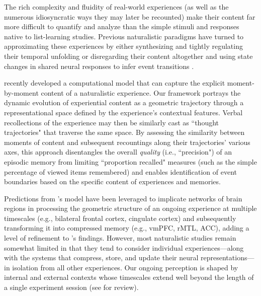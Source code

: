 \documentclass{article}
\begin{document}
The rich complexity and fluidity of real-world experiences (as well as the numerous idiosyncratic ways they may later be recounted) make their content far more difficult to quantify and analyze than the simple stimuli and responses native to list-learning studies.  Previous naturalistic paradigms have turned to approximating these experiences by either synthesizing and tightly regulating their temporal unfolding \citep[e.g.,][]{LernEtal11} or disregarding their content altogether and using state changes in shared neural responses to infer event transitions \citep[e.g.,][]{HowaEtal14,SimoEtal16,BaldEtal17}.

\cite{HeusEtal18c} recently developed a computational model that can capture the explicit moment-by-moment content of a naturalistic experience.  Our framework portrays the dynamic evolution of experiential content as a geometric trajectory through a representational space defined by the experience's contextual features.  Verbal recollections of the experience may then be similarly cast as ``thought trajectories" that traverse the same space.  By assessing the similarity between moments of content and subsequent recountings along their trajectories' various axes, this approach disentangles the overall \textit{quality} (i.e., ``precision") of an episodic memory from limiting ``proportion recalled" measures (such as the simple percentage of viewed items remembered) and enables identification of event boundaries based on the specific content of experiences and memories.

Predictions from \cite{HeusEtal18c}'s model have been leveraged to implicate networks of brain regions in processing the geometric structure of an ongoing experience at multiple timescales (e.g., bilateral frontal cortex, cingulate cortex) and subsequently transforming it into compressed memory (e.g., vmPFC, rMTL, ACC), adding a level of refinement to \cite{BaldEtal17}'s findings.  However, most naturalistic studies remain somewhat limited in that they tend to consider individual experiences—along with the systems that compress, store, and update their neural representations—in isolation from all other experiences.  Our ongoing perception is shaped by internal and external contexts whose timescales extend well beyond the length of a single experiment session (see \citealp{Mann19} for review).  
\end{document}
